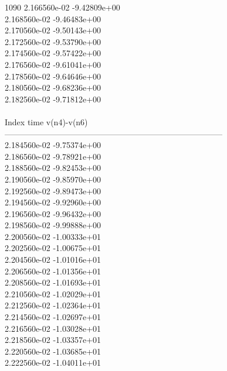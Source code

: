 1090	2.166560e-02	-9.42809e+00	\\ 	2.168560e-02	-9.46483e+00	\\ 	2.170560e-02	-9.50143e+00	\\ 	2.172560e-02	-9.53790e+00	\\ 	2.174560e-02	-9.57422e+00	\\ 	2.176560e-02	-9.61041e+00	\\ 	2.178560e-02	-9.64646e+00	\\ 	2.180560e-02	-9.68236e+00	\\ 	2.182560e-02	-9.71812e+00	\\ \hline
\\ \hline
Index   time            v(n4)-v(n6)     \\ \hline
--------------------------------------------------------------------------------\\ 	2.184560e-02	-9.75374e+00	\\ 	2.186560e-02	-9.78921e+00	\\ 	2.188560e-02	-9.82453e+00	\\ 	2.190560e-02	-9.85970e+00	\\ 	2.192560e-02	-9.89473e+00	\\ 	2.194560e-02	-9.92960e+00	\\ 	2.196560e-02	-9.96432e+00	\\ 	2.198560e-02	-9.99888e+00	\\ 	2.200560e-02	-1.00333e+01	\\ 	2.202560e-02	-1.00675e+01	\\ 	2.204560e-02	-1.01016e+01	\\ 	2.206560e-02	-1.01356e+01	\\ 	2.208560e-02	-1.01693e+01	\\ 	2.210560e-02	-1.02029e+01	\\ 	2.212560e-02	-1.02364e+01	\\ 	2.214560e-02	-1.02697e+01	\\ 	2.216560e-02	-1.03028e+01	\\ 	2.218560e-02	-1.03357e+01	\\ 	2.220560e-02	-1.03685e+01	\\ 	2.222560e-02	-1.04011e+01	\\ \hline
